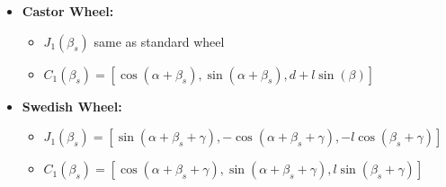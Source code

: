 \documentclass[a4paper]{article}
\newcommand{\ides}[1]{\item \textbf{#1}}
\begin{document}
\begin{itemize}
\begin{itemize}
        \end{itemize}
    \ides{Castor Wheel:}
        \begin{itemize}
            \item $J_1(\beta_s)$ same as standard wheel
            \item $C_1(\beta_s) = [\cos(\alpha + \beta_s), \sin(\alpha + \beta_s), d + l \sin(\beta)]$
        \end{itemize}
    \ides{Swedish Wheel:}
        \begin{itemize}
            \item $J_1(\beta_s) = [\sin(\alpha + \beta_s + \gamma), -\cos(\alpha + \beta_s + \gamma), -l \cos(\beta_s + \gamma)]$
            \item $C_1(\beta_s) = [\cos(\alpha + \beta_s + \gamma), \sin(\alpha + \beta_s + \gamma), l \sin(\beta_s + \gamma)]$
        \end{itemize}
\end{itemize}
\end{document}
